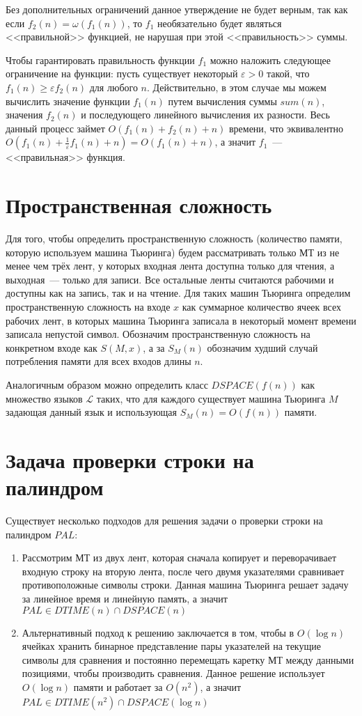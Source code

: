 \documentclass[
    11pt,
    a4paper
]{article}
\theoremstyle{definition}
\begin{document}
Без дополнительных ограничений данное утверждение не будет верным, так как если $f_2(n) = \omega(f_1(n))$, то $f_1$ необязательно будет являться <<правильной>> функцией, не нарушая при этой <<правильность>> суммы.

Чтобы гарантировать правильность функции $f_1$ можно наложить следующее ограничение на функции: пусть существует некоторый $\varepsilon > 0$ такой, что $f_1(n) \geq \varepsilon f_2(n)$ для любого $n$. Действительно, в этом случае мы можем вычислить значение функции $f_1(n)$ путем вычисления суммы $sum(n)$, значения $f_2(n)$ и последующего линейного вычисления их разности. Весь данный процесс займет $O(f_1(n) + f_2(n) + n)$ времени, что эквивалентно $O(f_1(n) + \frac{1}{\varepsilon} f_1(n) + n) = O(f_1(n) + n)$, а значит $f_1$~--- <<правильная>> функция.

\section{Пространственная сложность}

Для того, чтобы определить пространственную сложность (количество памяти, которую используем машина Тьюринга) будем рассматривать только МТ из не менее чем трёх лент, у которых входная лента доступна только для чтения, а выходная~--- только для записи. Все остальные ленты считаются рабочими и доступны как на запись, так и на чтение. Для таких машин Тьюринга определим пространственную сложность на входе $x$ как суммарное количество ячеек всех рабочих лент, в которых машина Тьюринга записала в некоторый момент времени записала непустой символ. Обозначим пространственную сложность на конкретном входе как $S(M, x)$, а за $S_M(n)$ обозначим худший случай потребления памяти для всех входов длины $n$.

Аналогичным образом можно определить класс $DSPACE(f(n))$ как множество языков $\mathcal{L}$ таких, что для каждого существует машина Тьюринга $M$ задающая данный язык и использующая $S_M(n) = O(f(n))$ памяти.

\section{Задача проверки строки на палиндром}

Существует несколько подходов для решения задачи о проверки строки на палиндром $PAL$:
\begin{enumerate}
\item Рассмотрим МТ из двух лент, которая сначала копирует и переворачивает входную строку на вторую лента, после чего двумя указателями сравнивает противоположные символы строки. Данная машина Тьюринга решает задачу за линейное время и линейную память, а значит $PAL \in DTIME(n) \cap DSPACE(n)$
\item Альтернативный подход к решению заключается в том, чтобы в $O(\log n)$ ячейках хранить бинарное представление пары указателей на текущие символы для сравнения и постоянно перемещать каретку МТ между данными позициями, чтобы производить сравнения. Данное решение использует $O(\log n)$ памяти и работает за $O(n^2)$, а значит $PAL \in DTIME(n^2) \cap DSPACE(\log n)$
\end{enumerate}
\end{document}
